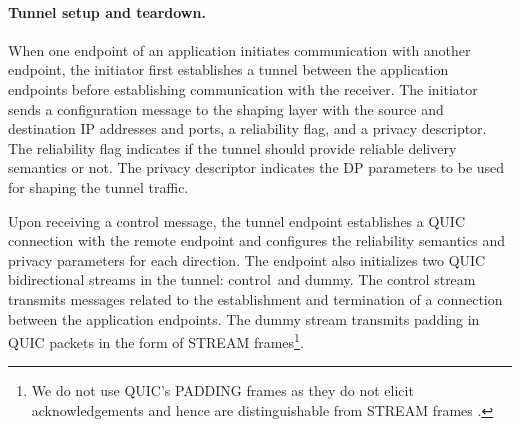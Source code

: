 \paragraph{Tunnel setup and teardown.}
{When one endpoint of an application initiates communication with
another endpoint, the initiator first establishes a {\sys} tunnel between the
application endpoints before establishing communication with the receiver. The
initiator sends a configuration message to the shaping layer with the source and
destination IP addresses and ports, a reliability flag, and a privacy descriptor.
The reliability flag indicates if the tunnel should provide reliable delivery
semantics or not. The privacy descriptor indicates the DP parameters to be used
for shaping the tunnel traffic.

Upon receiving a control message, the tunnel endpoint establishes a QUIC
connection with the remote endpoint and configures the reliability semantics
and privacy parameters
for each direction.
The endpoint also
initializes two QUIC bidirectional streams in the tunnel: control~and
dummy.
The control stream transmits
messages related to the establishment and termination of a connection
between the application endpoints. The dummy stream transmits padding
in QUIC packets in the form of STREAM frames\footnote{We do not use QUIC's
PADDING frames as they do not elicit acknowledgements and hence are
distinguishable from STREAM frames \cite{rfc9000}.}.



}
